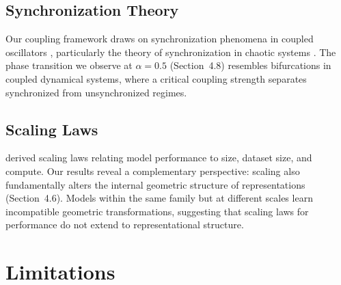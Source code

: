 \documentclass[10pt]{article} %
\theoremstyle{plain}
\theoremstyle{definition}
\theoremstyle{remark}
\begin{document}
\subsection{Synchronization Theory}

Our coupling framework draws on synchronization phenomena in coupled oscillators \citep{kuramoto1984chemical,strogatz2000}, particularly the theory of synchronization in chaotic systems \citep{pecora1990}. The phase transition we observe at $\alpha = 0.5$ (Section~4.8) resembles bifurcations in coupled dynamical systems, where a critical coupling strength separates synchronized from unsynchronized regimes.

\subsection{Scaling Laws}

\citet{kaplan2020scaling} derived scaling laws relating model performance to size, dataset size, and compute. Our results reveal a complementary perspective: scaling also fundamentally alters the internal geometric structure of representations (Section~4.6). Models within the same family but at different scales learn incompatible geometric transformations, suggesting that scaling laws for performance do not extend to representational structure.

\section{Limitations}
\end{document}
